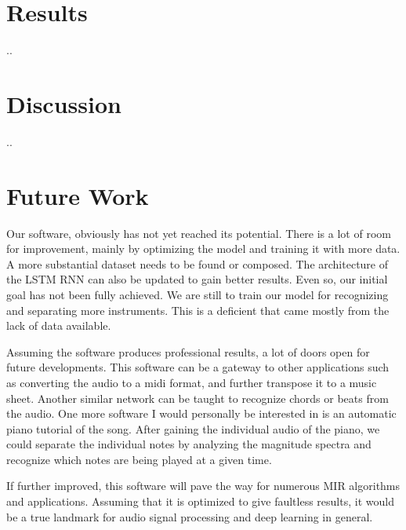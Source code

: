 \documentclass[../Thesis.tex]{subfiles}
\begin{document}
\section {Results}
..

\section {Discussion}
..

\section {Future Work}

Our software, obviously has not yet reached its potential. There is a lot of room for improvement, mainly by optimizing the model and training it with more data. A more substantial dataset needs to be found or composed. The architecture of the LSTM RNN can also be updated to gain better results. Even so, our initial goal has not been fully achieved. We are still to train our model for recognizing and separating more instruments. This is a deficient that came mostly from the lack of data available.

Assuming the software produces professional results, a lot of doors open for future developments. This software can be a gateway to other applications such as converting the audio to a midi format, and further transpose it to a music sheet. Another similar network can be taught to recognize chords or beats from the audio. One more software I would personally be interested in is an automatic piano tutorial of the song. After gaining the individual audio of the piano, we could separate the individual notes by analyzing the magnitude spectra and recognize which notes are being played at a given time. 

If further improved, this software will pave the way for numerous MIR algorithms and applications. Assuming that it is optimized to give faultless results, it would be a true landmark for audio signal processing and deep learning in general.
\end{document}
